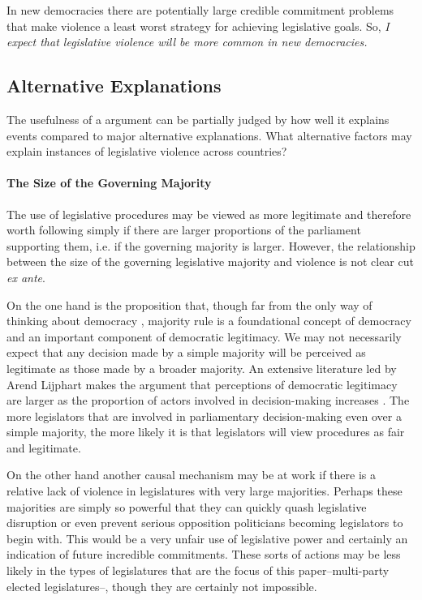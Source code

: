\documentclass[a4paper]{article}\usepackage[]{graphicx}\usepackage[]{color}
\begin{document}
In new democracies there are potentially large credible commitment problems that make violence a least worst strategy for achieving legislative goals. So, \emph{I expect that legislative violence will be more common in new democracies.}

\subsection{Alternative Explanations}

The usefulness of a argument can be partially judged by how well it explains events compared to major alternative explanations. What alternative factors may explain instances of legislative violence across countries?

\paragraph{The Size of the Governing Majority}

The use of legislative procedures may be viewed as more legitimate and therefore worth following simply if there are larger proportions of the parliament supporting them, i.e. if the governing majority is larger. However, the relationship between the size of the governing legislative majority and violence is not clear cut \emph{ex ante}. 

On the one hand is the proposition that, though far from the only way of thinking about democracy \cite[see][for a discussion]{Follesdal2006}, majority rule is a foundational concept of democracy \citep{Dahl1989} and an important component of democratic legitimacy. We may not necessarily expect that any decision made by a simple majority will be perceived as legitimate as those made by a broader majority. An extensive literature led by Arend Lijphart makes the argument that perceptions of democratic legitimacy are larger as the proportion of actors involved in decision-making increases \citep[see][]{Lijphart2007}. The more legislators that are involved in parliamentary decision-making even over a simple majority, the more likely it is that legislators will view procedures as fair and legitimate. 

On the other hand another causal mechanism may be at work if there is a relative lack of violence in legislatures with very large majorities. Perhaps these majorities are simply so powerful that they can quickly quash legislative disruption or even prevent serious opposition politicians becoming legislators to begin with. This would be a very unfair use of legislative power and certainly an indication of future incredible commitments. These sorts of actions may be less likely in the types of legislatures that are the focus of this paper--multi-party elected legislatures--, though they are certainly not impossible. 
\end{document}
